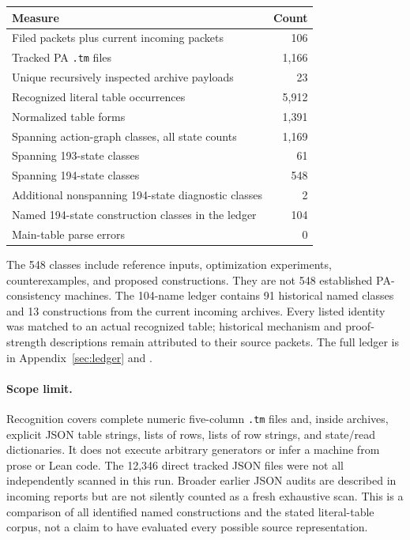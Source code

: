 \documentclass[10pt,a4paper]{article}
\theoremstyle{definition}
\begin{document}
\begin{center}
\begin{tabular}{lr}
\toprule Measure & Count\\\midrule
Filed packets plus current incoming packets & 106\\
Tracked PA \texttt{.tm} files & 1,166\\
Unique recursively inspected archive payloads & 23\\
Recognized literal table occurrences & 5,912\\
Normalized table forms & 1,391\\
Spanning action-graph classes, all state counts & 1,169\\
Spanning 193-state classes & 61\\
Spanning 194-state classes & 548\\
Additional nonspanning 194-state diagnostic classes & 2\\
Named 194-state construction classes in the ledger & 104\\
Main-table parse errors & 0\\
\bottomrule
\end{tabular}
\end{center}

The 548 classes include reference inputs, optimization experiments,
counterexamples, and proposed constructions. They are not 548 established
PA-consistency machines. The 104-name ledger contains 91 historical named
classes and 13 constructions from the current incoming archives. Every
listed identity was matched to an actual recognized table; historical
mechanism and proof-strength descriptions remain attributed to their
source packets. The full ledger is in Appendix~\ref{sec:ledger} and
.

\paragraph{Scope limit.}
Recognition covers complete numeric five-column \texttt{.tm} files and,
inside archives, explicit JSON table strings, lists of rows, lists of
row strings, and state/read dictionaries. It does not execute arbitrary
generators or infer a machine from prose or Lean code. The 12,346 direct
tracked JSON files were not all independently scanned in this run.
Broader earlier JSON audits are described in incoming reports but are not
silently counted as a fresh exhaustive scan. This is a comparison of all
identified named constructions and the stated literal-table corpus,
not a claim to have evaluated every possible source representation.
\end{document}
